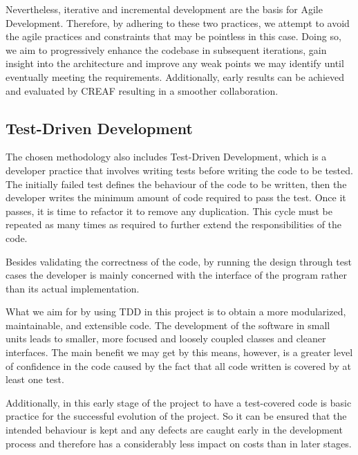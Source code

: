Nevertheless, iterative and incremental development are the basis for Agile Development. Therefore, by adhering to these two practices, we attempt to avoid the agile practices and constraints that may be pointless in this case. Doing so, we aim to progressively enhance the codebase in subsequent iterations, gain insight into the architecture and improve any weak points we may identify until eventually meeting the requirements. Additionally, early results can be achieved and evaluated by CREAF resulting in a smoother collaboration.

\subsection{Test-Driven Development}

The chosen methodology also includes Test-Driven Development, which is a developer practice that involves writing tests before writing the code to be tested. The initially failed test defines the behaviour of the code to be written, then the developer writes the minimum amount of code required to pass the test. Once it passes, it is time to refactor it to remove any duplication. This cycle must be repeated as many times as required to further extend the responsibilities of the code.

Besides validating the correctness of the code, by running the design through test cases the developer is mainly concerned with the interface of the program rather than its actual implementation.

What we aim for by using TDD in this project is to obtain a more modularized, maintainable, and extensible code. The development of the software in small units leads to smaller, more focused and loosely coupled classes and cleaner interfaces. The main benefit we may get by this means, however, is a greater level of confidence in the code caused by the fact that all code written is covered by at least one test.

Additionally, in this early stage of the project to have a test-covered code is basic practice for the successful evolution of the project. So it can be ensured that the intended behaviour is kept and any defects are caught early in the development process and therefore has a considerably less impact on costs than in later stages.
